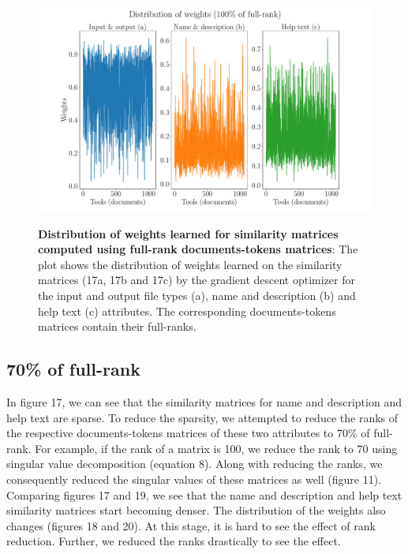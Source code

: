 \begin{figure}[h]
\begin{centering}
    {\includegraphics[scale=0.37]{figures/Weights_100.pdf}}
    \caption[Distribution of weights learned for similarity matrices computed using full-rank documents-tokens matrices]{\textbf{Distribution of weights learned for similarity matrices computed using full-rank documents-tokens matrices}: The plot shows the distribution of weights learned on the similarity matrices (17a, 17b and 17c) by the gradient descent optimizer for the input and output file types (a), name and description (b) and help text (c) attributes. The corresponding documents-tokens matrices contain their full-ranks.}
\end{centering}
\end{figure}

\subsection{70\% of full-rank}
In figure 17, we can see that the similarity matrices for name and description and help text are sparse. To reduce the sparsity,  we attempted to reduce the ranks of the respective documents-tokens matrices of these two attributes to 70\% of full-rank. For example, if the rank of a matrix is 100, we reduce the rank to 70 using singular value decomposition (equation 8). Along with reducing the ranks, we consequently reduced the singular values of these matrices as well (figure 11). Comparing figures 17 and 19, we see that the name and description and help text similarity matrices start becoming denser. The distribution of the weights also changes (figures 18 and 20). At this stage, it is hard to see the effect of rank reduction. Further, we reduced the ranks drastically to see the effect.

